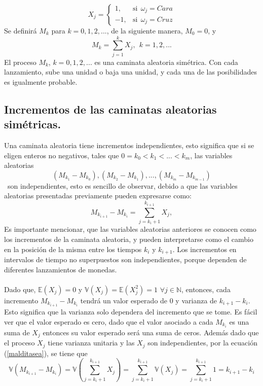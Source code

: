 \documentclass[11pt,notitlepage]{article}
\begin{document}
\begin{equation*}
\label{eq:diana.xj}
    X_{j} = \begin{cases}
                1,& \mbox{si}\ \ \omega_{j}=Cara \\
                -1,& \mbox{si}\ \ \omega_{j}=Cruz
                \end{cases}
\end{equation*}
Se definirá \(M_k\) para \(k=0,1,2,...\), de la siguiente manera, \(M_{0}=0\), y
\begin{equation}
    M_{k}=\sum_{j=1}^k X_{j}, \ \ k=1,2,...
\end{equation}
El proceso \(M_{k}\), \(k=0,1,2,...\) es una caminata aleatoria simétrica. Con cada lanzamiento, sube una unidad o baja una unidad, y cada una de las posibilidades es igualmente probable.

\subsection{Incrementos de las caminatas aleatorias simétricas.}
Una caminata aleatoria tiene incrementos independientes, esto significa que si se eligen enteros no negativos, tales que \(0=k_{0}<k_{1}<...<k_{m}\), las variables aleatorias
\begin{equation}\label{MV.1}
\left (  M_{k_{1}}-M_{k_{0}}\right ) , \left ( M_{k_{2}}-M_{k_{1}}\right ),...,\left (M_{k_{m}}-M_{k_{m-1}}\right )
\end{equation}
\ son independientes, esto es sencillo de observar, debido a que las variables aleatorias presentadas previamente pueden expresarse como:
\begin{equation}\label{malditasea}
    M_{k_{i+1}}-M_{k_{i}}=\sum_{j=k_{i}+1}^{k_{i+1}} X_{j},
\end{equation}
 Es importante mencionar, que las variables aleatorias anteriores se conocen como los incrementos de la caminata aleatoria, y pueden interpretarse como el cambio en la posición de la misma entre los tiempos \(k_{i}\) y \(k_{i+1}\). Los incrementos en intervalos de tiempo no superpuestos son independientes, porque dependen de diferentes lanzamientos de monedas.\\ \\
Dado que, \(\mathbb{E}\left ( X_{j} \right )=0 \) y \(\mathbb{V}(X_{j})=\mathbb{E}(X_{j}^{2})=1\) \(\forall j\in \mathbb{N}\),  entonces, cada incremento \(M_{k_{i+1}}-M_{k_{i}}\) tendrá un valor esperado de 0 y varianza de \(k_{i+1}-k_{i}\). Esto significa que la varianza solo dependera del incremento que se tome. Es fácil ver que el valor esperado es cero, dado que el valor asociado a cada   \(M_{k_{i}}\)  es una suma de \(X_{j}\) entonces su valor esperado será una suma de ceros. Además dado que el proceso \(X_j\) tiene varianza unitaria y las \(X_{j}\) son independientes, por la ecuación (\ref{malditasea}), se tiene que
\begin{equation}\label{MV.2}
    \mathbb{V}(M_{k_{i+1}}-M_{k_{i}}) =\mathbb{V}(\sum_{j=k_{i}+1}^{k_{i+1}}X_{j})= \sum_{j=k_{i}+1}^{k_{i+1}} \mathbb{V}(X_{j})= \sum_{j=k_{i}+1}^{k_{i+1}}1=k_{i+1}-k_{i}
\end{equation}
\end{document}
